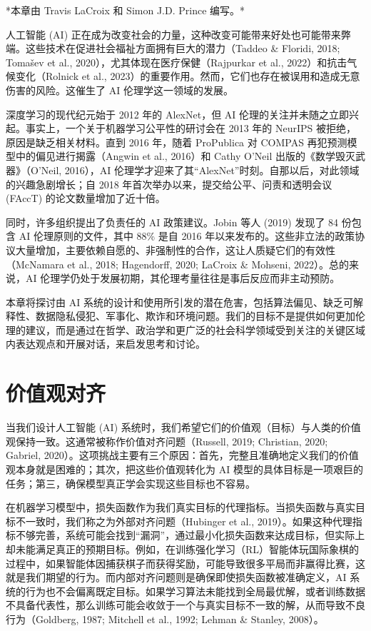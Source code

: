 \documentclass[lang=cn,newtx,10pt,scheme=chinese]{elegantbook}
\begin{document}
*本章由 Travis LaCroix 和 Simon J.D. Prince 编写。*

人工智能 (AI) 正在成为改变社会的力量，这种改变可能带来好处也可能带来弊端。这些技术在促进社会福祉方面拥有巨大的潜力（Taddeo \& Floridi, 2018; Tomašev et al., 2020），尤其体现在医疗保健（Rajpurkar et al., 2022）和抗击气候变化（Rolnick et al., 2023）的重要作用。然而，它们也存在被误用和造成无意伤害的风险。这催生了 AI 伦理学这一领域的发展。

深度学习的现代纪元始于 2012 年的 AlexNet，但 AI 伦理的关注并未随之立即兴起。事实上，一个关于机器学习公平性的研讨会在 2013 年的 NeurIPS 被拒绝，原因是缺乏相关材料。直到 2016 年，随着 ProPublica 对 COMPAS 再犯预测模型中的偏见进行揭露（Angwin et al., 2016）和 Cathy O’Neil 出版的《数学毁灭武器》（O’Neil, 2016），AI 伦理学才迎来了其“AlexNet”时刻。自那以后，对此领域的兴趣急剧增长；自 2018 年首次举办以来，提交给公平、问责和透明会议 (FAccT) 的论文数量增加了近十倍。

同时，许多组织提出了负责任的 AI 政策建议。Jobin 等人 (2019) 发现了 84 份包含 AI 伦理原则的文件，其中 88\% 是自 2016 年以来发布的。这些非立法的政策协议大量增加，主要依赖自愿的、非强制性的合作，这让人质疑它们的有效性（McNamara et al., 2018; Hagendorff, 2020; LaCroix \& Mohseni, 2022）。总的来说，AI 伦理学仍处于发展初期，其伦理考量往往是事后反应而非主动预防。

本章将探讨由 AI 系统的设计和使用所引发的潜在危害，包括算法偏见、缺乏可解释性、数据隐私侵犯、军事化、欺诈和环境问题。我们的目标不是提供如何更加伦理的建议，而是通过在哲学、政治学和更广泛的社会科学领域受到关注的关键区域内表达观点和开展对话，来启发思考和讨论。

\section{价值观对齐}
当我们设计人工智能 (AI) 系统时，我们希望它们的价值观（目标）与人类的价值观保持一致。这通常被称作价值对齐问题（Russell, 2019; Christian, 2020; Gabriel, 2020）。这项挑战主要有三个原因：首先，完整且准确地定义我们的价值观本身就是困难的；其次，把这些价值观转化为 AI 模型的具体目标是一项艰巨的任务；第三，确保模型真正学会实现这些目标也不容易。

在机器学习模型中，损失函数作为我们真实目标的代理指标。当损失函数与真实目标不一致时，我们称之为外部对齐问题（Hubinger et al., 2019）。如果这种代理指标不够完善，系统可能会找到“漏洞”，通过最小化损失函数来达成目标，但实际上却未能满足真正的预期目标。例如，在训练强化学习（RL）智能体玩国际象棋的过程中，如果智能体因捕获棋子而获得奖励，可能导致很多平局而非赢得比赛，这就是我们期望的行为。而内部对齐问题则是确保即使损失函数被准确定义，AI 系统的行为也不会偏离既定目标。如果学习算法未能找到全局最优解，或者训练数据不具备代表性，那么训练可能会收敛于一个与真实目标不一致的解，从而导致不良行为（Goldberg, 1987; Mitchell et al., 1992; Lehman \& Stanley, 2008）。
\end{document}
